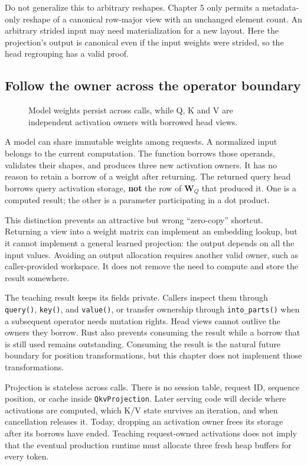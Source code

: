 \documentclass[
  10pt,
]{article}
\begin{document}
Do not generalize this to arbitrary reshapes. Chapter 5 only permits a
metadata-only reshape of a canonical row-major view with an unchanged
element count. An arbitrary strided input may need materialization for a
new layout. Here the projection's output is canonical even if the input
weights were strided, so the head regrouping has a valid proof.

\subsection{Follow the owner across the operator
boundary}\label{follow-the-owner-across-the-operator-boundary}

\begin{figure}[H]\centering\resizebox{\linewidth}{!}{}\caption{Model weights persist across calls, while Q, K and V are independent activation owners with borrowed head views.}\end{figure}

A model can share immutable weights among requests. A normalized input
belongs to the current computation. The function borrows those operands,
validates their shapes, and produces three new activation owners. It has
no reason to retain a borrow of a weight after returning. The returned
query head borrows query activation storage, \textbf{not} the row of
\(\mathbf{W}_Q\) that produced it. One is a computed result; the other
is a parameter participating in a dot product.

This distinction prevents an attractive but wrong ``zero-copy''
shortcut. Returning a view into a weight matrix can implement an
embedding lookup, but it cannot implement a general learned projection:
the output depends on all the input values. Avoiding an output
allocation requires another valid owner, such as caller-provided
workspace. It does not remove the need to compute and store the result
somewhere.

The teaching result keeps its fields private. Callers inspect them
through \texttt{query()}, \texttt{key()}, and \texttt{value()}, or
transfer ownership through \texttt{into\_parts()} when a subsequent
operator needs mutation rights. Head views cannot outlive the owners
they borrow. Rust also prevents consuming the result while a borrow that
is still used remains outstanding. Consuming the result is the natural
future boundary for position transformations, but this chapter does not
implement those transformations.

Projection is stateless across calls. There is no session table, request
ID, sequence position, or cache inside \texttt{QkvProjection}. Later
serving code will decide where activations are computed, which K/V state
survives an iteration, and when cancellation releases it. Today,
dropping an activation owner frees its storage after its borrows have
ended. Teaching request-owned activations does not imply that the
eventual production runtime must allocate three fresh heap buffers for
every token.
\end{document}
